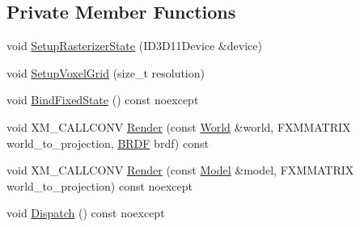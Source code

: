 \subsection*{Private Member Functions}
\begin{DoxyCompactItemize}
\item 
void \hyperlink{classmage_1_1rendering_1_1_voxelization_pass_a7f8af2ecd3eb69f4f052be7b9ce67650}{Setup\+Rasterizer\+State} (I\+D3\+D11\+Device \&device)
\item 
void \hyperlink{classmage_1_1rendering_1_1_voxelization_pass_a09f3b3c1a08b28c3815fb4fa1f0611f5}{Setup\+Voxel\+Grid} (size\+\_\+t resolution)
\item 
void \hyperlink{classmage_1_1rendering_1_1_voxelization_pass_ae69d6465ab918f12940339436fe56c56}{Bind\+Fixed\+State} () const noexcept
\item 
void X\+M\+\_\+\+C\+A\+L\+L\+C\+O\+NV \hyperlink{classmage_1_1rendering_1_1_voxelization_pass_abe14ead55536ae972d964d5bdf4d13ae}{Render} (const \hyperlink{classmage_1_1rendering_1_1_world}{World} \&world, F\+X\+M\+M\+A\+T\+R\+IX world\+\_\+to\+\_\+projection, \hyperlink{namespacemage_1_1rendering_ab8fe8684ca4bd74ba3a394b00cf125b5}{B\+R\+DF} brdf) const
\item 
void X\+M\+\_\+\+C\+A\+L\+L\+C\+O\+NV \hyperlink{classmage_1_1rendering_1_1_voxelization_pass_aa993ec5ff093f3948f13bf3187a11e6c}{Render} (const \hyperlink{classmage_1_1rendering_1_1_model}{Model} \&model, F\+X\+M\+M\+A\+T\+R\+IX world\+\_\+to\+\_\+projection) const noexcept
\item 
void \hyperlink{classmage_1_1rendering_1_1_voxelization_pass_a5026abcbe3aad3627e96ee055df8b842}{Dispatch} () const noexcept
\end{DoxyCompactItemize}
